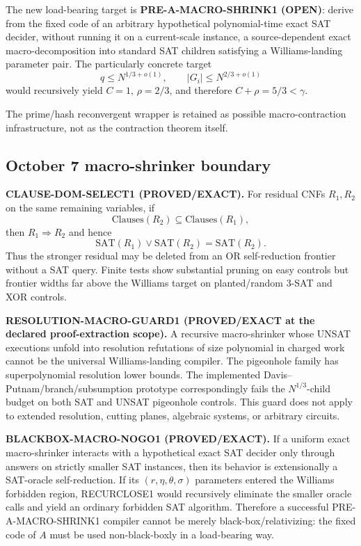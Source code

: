 \documentclass[11pt]{article}
\theoremstyle{plain}
\theoremstyle{definition}
\theoremstyle{remark}
\begin{document}
The new load-bearing target is
\textbf{PRE-A-MACRO-SHRINK1 (OPEN)}: derive from the fixed code of an arbitrary
hypothetical polynomial-time exact SAT decider, without running it on a
current-scale instance, a source-dependent exact macro-decomposition into
standard SAT children satisfying a Williams-landing parameter pair.  The
particularly concrete target
\[
q\le N^{1/3+o(1)},
\qquad
|G_i|\le N^{2/3+o(1)}
\]
would recursively yield \(C=1\), \(\rho=2/3\), and therefore
\(C+\rho=5/3<\gamma\).

The prime/hash reconvergent wrapper is retained as possible macro-contraction
infrastructure, not as the contraction theorem itself.


\subsection{October 7 macro-shrinker boundary}

\textbf{CLAUSE-DOM-SELECT1 (PROVED/EXACT).}
For residual CNFs \(R_1,R_2\) on the same remaining variables, if
\[
\mathrm{Clauses}(R_2)\subseteq\mathrm{Clauses}(R_1),
\]
then \(R_1\Rightarrow R_2\) and hence
\[
\mathrm{SAT}(R_1)\vee\mathrm{SAT}(R_2)=\mathrm{SAT}(R_2).
\]
Thus the stronger residual may be deleted from an OR self-reduction frontier
without a SAT query.  Finite tests show substantial pruning on easy controls
but frontier widths far above the Williams target on planted/random 3-SAT and
XOR controls.

\textbf{RESOLUTION-MACRO-GUARD1 (PROVED/EXACT at the declared proof-extraction
scope).}
A recursive macro-shrinker whose UNSAT executions unfold into resolution
refutations of size polynomial in charged work cannot be the universal
Williams-landing compiler.  The pigeonhole family has superpolynomial
resolution lower bounds.  The implemented Davis--Putnam/branch/subsumption
prototype correspondingly fails the \(N^{1/3}\)-child budget on both SAT and
UNSAT pigeonhole controls.  This guard does not apply to extended resolution,
cutting planes, algebraic systems, or arbitrary circuits.

\textbf{BLACKBOX-MACRO-NOGO1 (PROVED/EXACT).}
If a uniform exact macro-shrinker interacts with a hypothetical exact SAT
decider only through answers on strictly smaller SAT instances, then its
behavior is extensionally a SAT-oracle self-reduction.  If its
\((r,\eta,\theta,\sigma)\) parameters entered the Williams forbidden region,
RECURCLOSE1 would recursively eliminate the smaller oracle calls and yield an
ordinary forbidden SAT algorithm.  Therefore a successful
PRE-A-MACRO-SHRINK1 compiler cannot be merely black-box/relativizing:
the fixed code of \(A\) must be used non-black-boxly in a load-bearing way.
\end{document}

